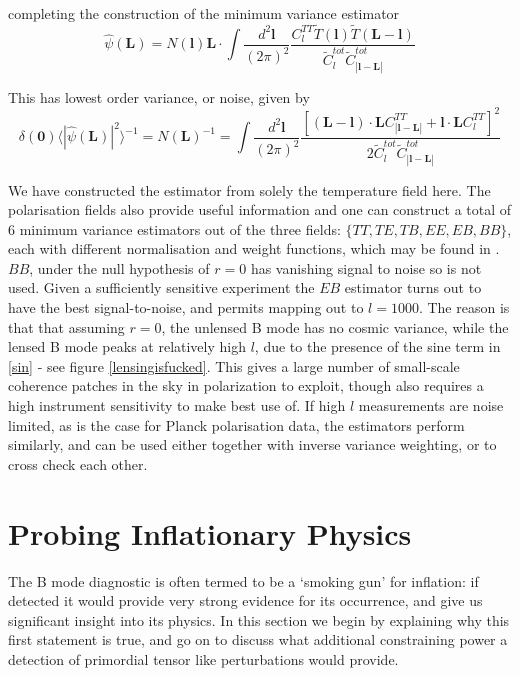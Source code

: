 \documentclass[a4paper,10pt]{article}
\renewcommand{\v}[1]{\mathbf{#1}}
\newcommand{\finttwo}[1]{\int \frac{d^2 \v{#1}}{(2\pi)^2}}
\begin{document}
completing the construction of the minimum variance estimator
\begin{equation}
\hat{\psi}(\v{L}) = N(\v{l})\v{L}\cdot\finttwo{l} \frac{C_l^{TT}\tilde{T}(\v{l})\tilde{T}(\v{L-l})}{\tilde{C}_l^{tot}\tilde{C}_{|\v{l}-\v{L}|}^{tot}}
\end{equation}


This has lowest order variance, or noise, given by
\begin{equation}
\delta(\v{0}) \langle |\hat{\psi}(\v{L})|^2 \rangle^{-1} =  N(\v{L})^{-1} = \finttwo{l}  \frac{[(\v{L}-\v{l})\cdot\v{L}C^{TT}_{|\v{l}-\v{L}|}+\v{l}\cdot\v{L}C_l^{TT}]^2}{2\tilde{C}_l^{tot}\tilde{C}_{|\v{l}-\v{L}|}^{tot}}
\end{equation}

We have constructed the estimator from solely the temperature field here. The polarisation fields also provide useful information and one can construct a total of 6 minimum variance estimators out of the three fields: $\{TT, TE, TB, EE, EB, BB\}$, each with different normalisation and weight functions, which may be found in \cite{hu-estimator}. $BB$, under the null hypothesis of $r=0$ has vanishing signal to noise so is not used. Given a sufficiently sensitive experiment the $EB$ estimator turns out to have the best signal-to-noise, and permits mapping out to $l=1000$. The reason is that that assuming $r=0$, the unlensed B mode has no cosmic variance, while the lensed B mode peaks at relatively high $l$, due to the presence of the sine term in \ref{sin} - see figure \ref{lensingisfucked}. This gives a large number of small-scale coherence patches in the sky in polarization to exploit, though also requires a high instrument sensitivity to make best use of. If high $l$ measurements are noise limited, as is the case for Planck polarisation data, the estimators perform similarly, and can be used either together with inverse variance weighting, or to cross check each other.


\newpage
\section{Probing Inflationary Physics}
\label{probe}

The B mode diagnostic is often termed to be a `smoking gun' for inflation: if detected it would provide very strong evidence for its occurrence, and give us significant insight into its physics. In this section we begin by explaining why this first statement is true, and go on to discuss what additional constraining power a detection of primordial tensor like perturbations would provide.
\end{document}
